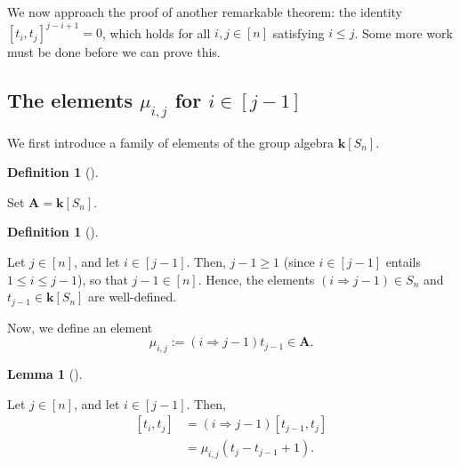 \documentclass[numbers=enddot,12pt,final,onecolumn,notitlepage]{scrartcl}%
\theoremstyle{definition}
\newtheorem{lem}[theo]{Lemma}
\newenvironment{lemma}[1][]
{\begin{lem}[#1]\begin{leftbar}}
{\end{leftbar}\end{lem}}
\newtheorem{defi}[theo]{Definition}
\newenvironment{definition}[1][]
{\begin{defi}[#1]\begin{leftbar}}
{\end{leftbar}\end{defi}}
\begin{document}
We now approach the proof of another remarkable theorem: the identity $\left[
t_{i},t_{j}\right]  ^{j-i+1}=0$, which holds for all $i,j\in\left[  n\right]
$ satisfying $i\leq j$. Some more work must be done before we can prove this.

\subsection{The elements $\mu_{i,j}$ for $i\in\left[  j-1\right]  $}

We first introduce a family of elements of the group algebra $\mathbf{k}%
\left[  S_{n}\right]  $.

\begin{definition}
Set $\mathbf{A}=\mathbf{k}\left[  S_{n}\right]  $.
\end{definition}

\begin{definition}
\label{def.muij}Let $j\in\left[  n\right]  $, and let $i\in\left[  j-1\right]
$. Then, $j-1\geq1$ (since $i\in\left[  j-1\right]  $ entails $1\leq i\leq
j-1$), so that $j-1\in\left[  n\right]  $. Hence, the elements $\left(
i\Longrightarrow j-1\right)  \in S_{n}$ and $t_{j-1}\in\mathbf{k}\left[
S_{n}\right]  $ are well-defined.

Now, we define an element%
\[
\mu_{i,j}:=\left(  i\Longrightarrow j-1\right)  t_{j-1}\in\mathbf{A}.
\]

\end{definition}

\begin{lemma}
\label{lem.com-mu}Let $j\in\left[  n\right]  $, and let $i\in\left[
j-1\right]  $. Then,%
\begin{align}
\left[  t_{i},t_{j}\right]   &  =\left(  i\Longrightarrow j-1\right)  \left[
t_{j-1},t_{j}\right] \label{eq.lem.com-mu.1}\\
&  =\mu_{i,j}\left(  t_{j}-t_{j-1}+1\right)  . \label{eq.lem.com-mu.2}%
\end{align}

\end{lemma}
\end{document}
